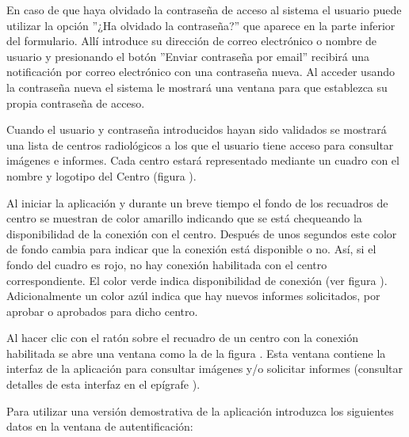 \documentclass{plantilla-manual-usuario}
\begin{document}

En caso de que haya olvidado la contraseña de acceso al sistema el usuario puede utilizar la opción ”¿Ha olvidado la contraseña?” que aparece en la parte inferior del formulario. Allí introduce su dirección de correo electrónico o nombre de usuario y presionando el botón ”Enviar contraseña por email” recibirá una notificación por correo electrónico con una contraseña nueva. Al acceder usando la contraseña nueva el sistema le mostrará una ventana para que establezca su propia contraseña de acceso.

Cuando el usuario y contraseña introducidos hayan sido validados se mostrará una lista de centros radiológicos a los que el usuario tiene acceso para consultar imágenes e informes. Cada centro estará representado mediante un cuadro con el nombre y logotipo del Centro (figura ).


Al iniciar la aplicación y durante un breve tiempo el fondo de los recuadros de centro se muestran de color amarillo indicando que se está chequeando la disponibilidad de la conexión con el centro. Después de unos segundos este color de fondo cambia para indicar que la conexión está disponible o no. Así, si el fondo del cuadro es rojo, no hay conexión habilitada con el centro correspondiente. El color verde indica disponibilidad de conexión (ver figura ). Adicionalmente un color azúl indica que hay nuevos informes solicitados, por aprobar o aprobados para dicho centro. 


Al hacer clic con el ratón sobre el recuadro de un centro con la conexión habilitada se abre una ventana como la de la figura . Esta ventana contiene la interfaz de la aplicación para consultar imágenes y/o solicitar informes (consultar detalles de esta interfaz en el epígrafe ).


Para utilizar una versión demostrativa de la aplicación introduzca los siguientes datos en la ventana de autentificación:
\end{document}
